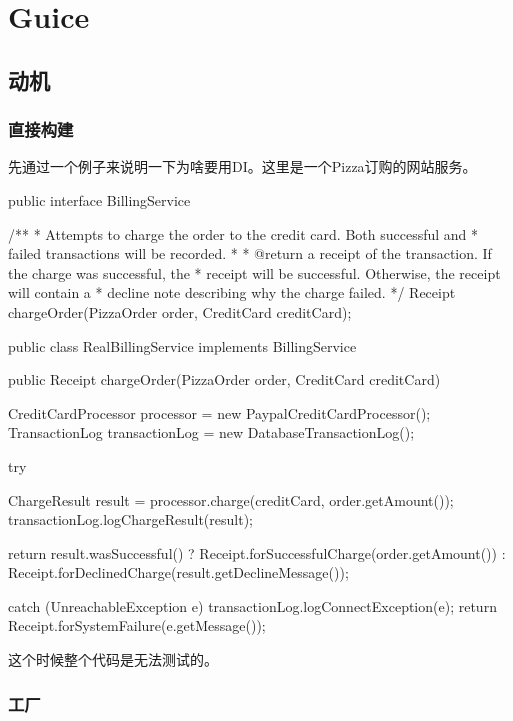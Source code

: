 \chapter{Guice}

\section{动机}

\subsection{直接构建}

先通过一个例子来说明一下为啥要用DI。这里是一个Pizza订购的网站服务。

\begin{Java}[服务接口定义]
public interface BillingService {

  /**
   * Attempts to charge the order to the credit card. Both successful and
   * failed transactions will be recorded.
   *
   * @return a receipt of the transaction. If the charge was successful, the
   *      receipt will be successful. Otherwise, the receipt will contain a
   *      decline note describing why the charge failed.
   */
  Receipt chargeOrder(PizzaOrder order, CreditCard creditCard);
}
\end{Java}

\begin{Java}[服务接口的具体实现]
public class RealBillingService implements BillingService {
  public Receipt chargeOrder(PizzaOrder order, CreditCard creditCard) {
    CreditCardProcessor processor = new PaypalCreditCardProcessor();
    TransactionLog transactionLog = new DatabaseTransactionLog();

    try {
      ChargeResult result = processor.charge(creditCard, order.getAmount());
      transactionLog.logChargeResult(result);

      return result.wasSuccessful()
          ? Receipt.forSuccessfulCharge(order.getAmount())
          : Receipt.forDeclinedCharge(result.getDeclineMessage());
     } catch (UnreachableException e) {
      transactionLog.logConnectException(e);
      return Receipt.forSystemFailure(e.getMessage());
    }
  }
}
\end{Java}

这个时候整个代码是无法测试的。

\subsection{工厂}

